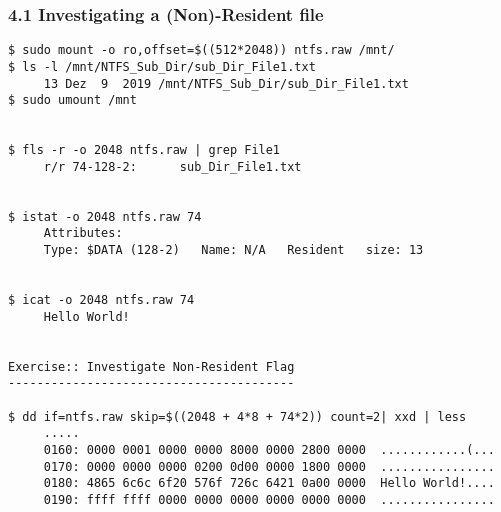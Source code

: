 \begin{frame}[fragile]
  \frametitle{4.1 Investigating a (Non)-Resident file}
  \begin{lstlisting}[basicstyle=\tiny]
$ sudo mount -o ro,offset=$((512*2048)) ntfs.raw /mnt/
$ ls -l /mnt/NTFS_Sub_Dir/sub_Dir_File1.txt
     13 Dez  9  2019 /mnt/NTFS_Sub_Dir/sub_Dir_File1.txt
$ sudo umount /mnt


$ fls -r -o 2048 ntfs.raw | grep File1
     r/r 74-128-2:      sub_Dir_File1.txt


$ istat -o 2048 ntfs.raw 74
     Attributes:
     Type: $DATA (128-2)   Name: N/A   Resident   size: 13


$ icat -o 2048 ntfs.raw 74
     Hello World!


Exercise:: Investigate Non-Resident Flag
----------------------------------------

$ dd if=ntfs.raw skip=$((2048 + 4*8 + 74*2)) count=2| xxd | less
     .....
     0160: 0000 0001 0000 0000 8000 0000 2800 0000  ............(...
     0170: 0000 0000 0000 0200 0d00 0000 1800 0000  ................
     0180: 4865 6c6c 6f20 576f 726c 6421 0a00 0000  Hello World!....
     0190: ffff ffff 0000 0000 0000 0000 0000 0000  ................
  \end{lstlisting}
\end{frame}


